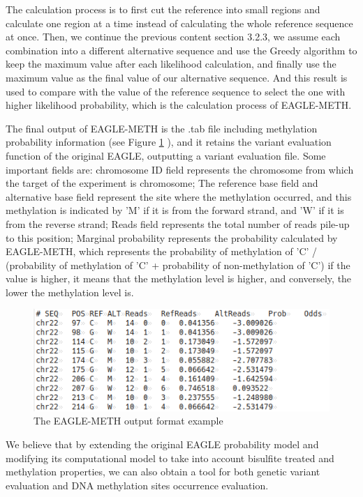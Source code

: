 \documentclass{PHlab-thesis}
\begin{document}
The calculation process is to first cut the reference into small regions and calculate one region at a time instead of calculating the whole reference sequence at once.
Then, we continue the previous content section 3.2.3, we assume each combination into a different alternative sequence and use the Greedy algorithm to keep the maximum value after each likelihood calculation, and finally use the maximum value as the final value of our alternative sequence. And this result is used to compare with the value of the reference sequence to select the one with higher likelihood probability, which is the calculation process of EAGLE-METH.
\par The final output of EAGLE-METH is the .tab file including methylation probability information (see Figure \ref{fig:output} ), and it retains the variant evaluation function of the original EAGLE, outputting a variant evaluation file. Some important fields are: chromosome ID field represents the chromosome from which the target of the experiment is chromosome; 
The reference base field and alternative base field represent the site where the methylation occurred, and this methylation is indicated by 'M' if it is from the forward strand, and 'W' if it is from the reverse strand; 
Reads field represents the total number of reads pile-up to this position; Marginal probability represents the probability calculated by EAGLE-METH, which represents the probability of methylation of 'C' / (probability of methylation of 'C' + probability of non-methylation of 'C') if the value is higher, it means that the methylation level is higher, and conversely, the lower the methylation level is.
\begin{figure}[h]
  \centering
  \includegraphics[scale=0.8]{figures/output_example.PNG}
  \caption{The EAGLE-METH output format example}
  \label{fig:output} 
\end{figure}
\par We believe that by extending the original EAGLE probability model and modifying its computational model to take into account bisulfite treated and methylation properties, we can also obtain a tool for both genetic variant evaluation and DNA methylation sites occurrence evaluation.
\end{document}
